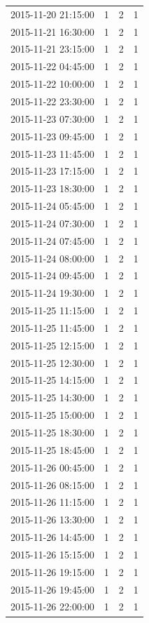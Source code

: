\begin{tabular}{lrrr}
2015-11-20 21:15:00 & 1 & 2 & 1 \\
2015-11-21 16:30:00 & 1 & 2 & 1 \\
2015-11-21 23:15:00 & 1 & 2 & 1 \\
2015-11-22 04:45:00 & 1 & 2 & 1 \\
2015-11-22 10:00:00 & 1 & 2 & 1 \\
2015-11-22 23:30:00 & 1 & 2 & 1 \\
2015-11-23 07:30:00 & 1 & 2 & 1 \\
2015-11-23 09:45:00 & 1 & 2 & 1 \\
2015-11-23 11:45:00 & 1 & 2 & 1 \\
2015-11-23 17:15:00 & 1 & 2 & 1 \\
2015-11-23 18:30:00 & 1 & 2 & 1 \\
2015-11-24 05:45:00 & 1 & 2 & 1 \\
2015-11-24 07:30:00 & 1 & 2 & 1 \\
2015-11-24 07:45:00 & 1 & 2 & 1 \\
2015-11-24 08:00:00 & 1 & 2 & 1 \\
2015-11-24 09:45:00 & 1 & 2 & 1 \\
2015-11-24 19:30:00 & 1 & 2 & 1 \\
2015-11-25 11:15:00 & 1 & 2 & 1 \\
2015-11-25 11:45:00 & 1 & 2 & 1 \\
2015-11-25 12:15:00 & 1 & 2 & 1 \\
2015-11-25 12:30:00 & 1 & 2 & 1 \\
2015-11-25 14:15:00 & 1 & 2 & 1 \\
2015-11-25 14:30:00 & 1 & 2 & 1 \\
2015-11-25 15:00:00 & 1 & 2 & 1 \\
2015-11-25 18:30:00 & 1 & 2 & 1 \\
2015-11-25 18:45:00 & 1 & 2 & 1 \\
2015-11-26 00:45:00 & 1 & 2 & 1 \\
2015-11-26 08:15:00 & 1 & 2 & 1 \\
2015-11-26 11:15:00 & 1 & 2 & 1 \\
2015-11-26 13:30:00 & 1 & 2 & 1 \\
2015-11-26 14:45:00 & 1 & 2 & 1 \\
2015-11-26 15:15:00 & 1 & 2 & 1 \\
2015-11-26 19:15:00 & 1 & 2 & 1 \\
2015-11-26 19:45:00 & 1 & 2 & 1 \\
2015-11-26 22:00:00 & 1 & 2 & 1 \\

\end{tabular}
